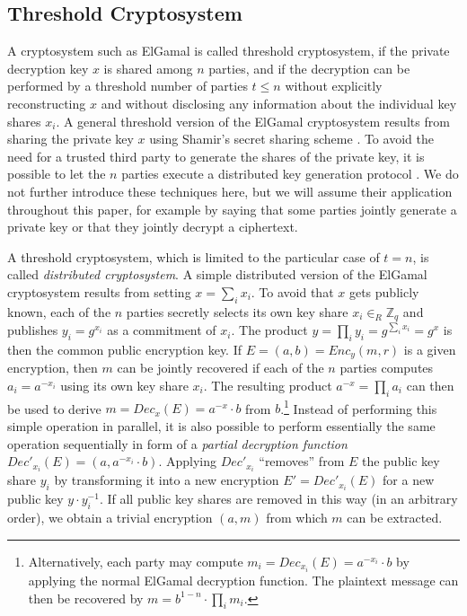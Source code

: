 \documentclass[bibtotoc,halfparskip,oneside]{scrreprt}
\begin{document}
\subsection{Threshold Cryptosystem} 

A cryptosystem such as ElGamal is called threshold cryptosystem, if the private decryption key $x$ is shared among $n$ parties, and if the decryption can be performed by a threshold number of parties $t \leq n$ without explicitly reconstructing $x$ and without disclosing any information about the individual key shares $x_i$. A general threshold version of the ElGamal cryptosystem results from sharing the private key $x$ using Shamir's secret sharing scheme \cite{pedersen91,shamir79b}. To avoid the need for a trusted third party to generate the shares of the private key, it is possible to let the $n$ parties execute a distributed key generation protocol \cite{GJKR99}. We do not further introduce these techniques here, but we will assume their application throughout this paper, for example by saying that some parties jointly generate a private key or that they jointly decrypt a ciphertext.

A threshold cryptosystem, which is limited to the particular case of $t=n$, is called \emph{distributed cryptosystem}. A simple distributed version of the ElGamal cryptosystem results from setting $x=\sum_i x_i$. To avoid that $x$ gets publicly known, each of the $n$ parties secretly selects its own key share $x_i \in_R\mathbb{Z}_q$ and publishes $y_i=g^{x_i}$ as a commitment of $x_i$. The product $y=\prod_i y_i = g^{\sum_i x_i}=g^x$ is then the common public encryption key. If $E=(a,b)=\mathit{Enc}_y(m,r)$ is a given encryption, then $m$ can be jointly recovered if each of the $n$ parties computes $a_i=a^{-x_i}$ using its own key share $x_i$. The resulting product $a^{-x}=\prod_i a_i$ can then be used to derive $m=\mathit{Dec}_x(E)=a^{-x}\cdot b$ from $b$.\footnote{Alternatively, each party may compute $m_i=\mathit{Dec}_{x_i}(E)=a^{-x_i}\cdot b$ by applying the normal ElGamal decryption function. The plaintext message can then be recovered by $m=b^{1-n}\cdot\prod_i m_i$.} Instead of performing this simple operation in parallel, it is also possible to perform essentially the same operation sequentially in form of a \emph{partial decryption function} $\mathit{Dec}'_{x_i}(E)=(a,a^{-x_i}\cdot b)$. Applying $\mathit{Dec}'_{x_i}$ ``removes'' from $E$ the public key share $y_i$ by transforming it into a new encryption $E'=\mathit{Dec}'_{x_i}(E)$ for a new public key $y\cdot y_i^{-1}$. If all public key shares are removed in this way (in an arbitrary order), we obtain a trivial encryption $(a,m)$ from which $m$ can be extracted.
\end{document}
